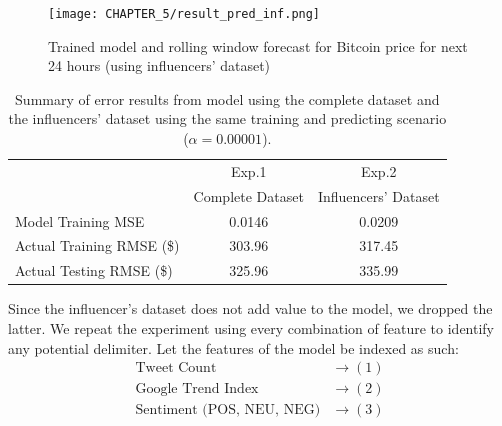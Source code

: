 \begin{figure}[H]
   \centering
   \texttt{[image: CHAPTER\_5/result\_pred\_inf.png]}
   \caption{Trained model and rolling window forecast for Bitcoin price for next 24 hours (using influencers' dataset)}
   \label{result_pred_inf}
\end{figure}
\begin{table}[H]
    \begin{center}
        \begin{tabular}{l |c |c }
        \label{result_summary}
            
              & Exp.1 & Exp.2 \\ &Complete Dataset & Influencers' Dataset\\
            \hline
            Model Training MSE & 0.0146 & 0.0209 \\
            
            Actual Training RMSE (\$) & 303.96 & 317.45\\
            Actual Testing RMSE (\$) & 325.96 & 335.99\\

        \end{tabular}
        \caption{Summary of error results from model using the complete dataset and the influencers' dataset using the same training and predicting scenario ($\alpha = 0.00001$).}
    \end{center}
\end{table}
\noindent Since the influencer's dataset does not add value to the model, we dropped the latter. We repeat the experiment using every combination of feature to identify any potential delimiter. Let the features of the model be indexed as such:
\begin{align*}
    \text{Tweet Count} & \rightarrow (1) \\
    \text{Google Trend Index} &\rightarrow (2) \\
    \text{Sentiment (POS, NEU, NEG)} &\rightarrow (3)
\end{align*}
